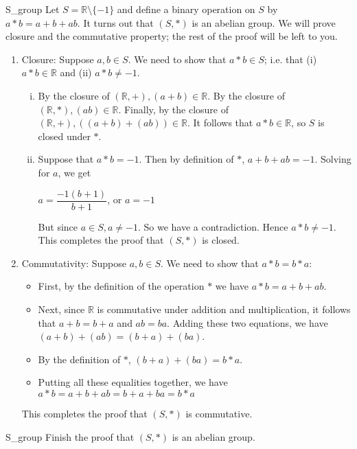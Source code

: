 \begin{example}{S_group}
Let $S = {\mathbb R} \setminus \{ -1 \}$ and define a binary operation on
$S$ by $a \ast b = a + b +ab$. It turns out that $(S, \ast)$ is an abelian group. We will prove closure and the commutative property; the rest of the proof will be left to you.
\begin{enumerate}[(1)]
\item
Closure:  Suppose $a, b \in S$.  We need to show that $a \ast b \in S$; i.e. that (i) $a \ast b \in {\mathbb R}$ and (ii) $a \ast b \neq -1$.
\begin{enumerate}[(i)]
\item
By the closure of $({\mathbb R}, +), (a + b) \in {\mathbb R}$.  By the closure of $({\mathbb R}, \ast), (ab) \in {\mathbb R}$.  Finally, by the closure of $({\mathbb R}, +), ((a + b) + (ab)) \in {\mathbb R}$.  
It follows that $a \ast b \in {\mathbb R}$, so $S$ is closed under $\ast$.

\item
Suppose that $a \ast b = -1$.  Then by definition of $\ast$, $a + b +ab = -1$.  Solving for $a$, we get
\begin{center}
$a = \dfrac{-1(b + 1)}{b + 1}$, or $a = -1$
\end{center}  

But since $a \in S, a \neq -1$.  So we have a contradiction.  Hence $a \ast b \neq -1$. This completes the proof that $(S, \ast)$ is closed.
\end{enumerate}

\item
Commutativity:  Suppose $a, b \in S$.  We need to show that $a \ast b = b \ast a$:
\begin{itemize}
\item
First, by the definition of the operation $\ast$ we have $a \ast b = a + b +ab$.
\item
Next, since ${\mathbb R}$ is commutative under addition and multiplication, 
it follows that $a + b = b + a$ and $ab = ba$. 
Adding these two equations, we have $(a + b) + (ab) = (b + a) + (ba)$.
\item
By the definition of $\ast$, $(b + a) + (ba) = b \ast a$.
\item
Putting all these equalities together, we have $a \ast b = a + b +ab = b + a + ba = b \ast a$
\end{itemize}

This completes the proof that $(S, \ast)$ is commutative.
\end{enumerate}

\begin{exercise}{S_group}
Finish the proof that $(S, \ast)$ is an abelian group.
\end{exercise}
\end{example}

